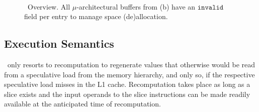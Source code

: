  
 \begin{figure}
     \centering
     ~~~
     \caption{ \arch\ Overview. All $\mu$-architectural buffers from (b) have  
an $\texttt{invalid}$ field per entry to
manage space (de)allocation.}
     \label{fig:overview}
\end{figure}
 
 
 \subsection{Execution Semantics}
 
 \arch\ only resorts to recomputation to regenerate values that otherwise would be read from a speculative load from the memory hierarchy, and only so, if the respective speculative load misses in the L1 cache. Recomputation takes place as long as a slice exists and the input operands to the slice instructions can be made readily available at the anticipated time of recomputation. 
 
